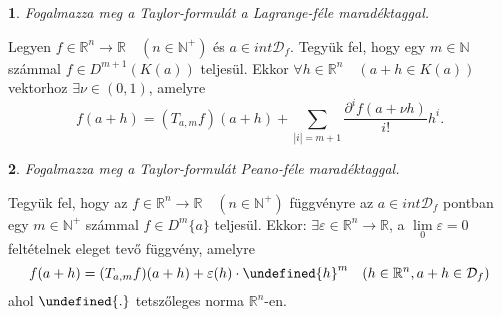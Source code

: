 \documentclass[a4paper]{article}
\def\R{\mathbb{R}}
\def\N{\mathbb{N}}
\theoremstyle{qstyle}
\newtheorem{question}{}{}
\let\norm\undefined %
\DeclarePairedDelimiter\norm{\lVert}{\rVert}
\begin{document}
	\newpage
	
	\begin{question}
		Fogalmazza meg a Taylor-formulát a Lagrange-féle maradéktaggal.
	\end{question}
	Legyen $f \in \R^n \to \R \quad (n \in \N^+)$ és $a \in int\mathcal{D}_f$. Tegyük fel, hogy egy $m \in \N$ számmal $f \in D^{m+1}(K(a))$ teljesül. Ekkor $\forall h \in \R^n \quad (a+h \in K(a))$ vektorhoz $\exists \nu \in (0,1)$, amelyre
	$$f(a+h)=(T_{a,m}f)(a+h)+\sum_{|i|=m+1}\frac{\partial^i f(a + \nu h)}{i!}h^i \text{.}$$
	
	\begin{question}
		Fogalmazza meg a Taylor-formulát Peano-féle maradéktaggal.
	\end{question}
	Tegyük fel, hogy az $f \in \R^n \to \R \quad (n \in \N^+)$ függvényre az $a \in int\mathcal{D}_f$ pontban egy $m \in \N^+$ számmal $f \in D^m\{a\}$ teljesül. Ekkor: $\exists \varepsilon \in \R^n \to \R$, a $\lim\limits_{0} \varepsilon = 0$ feltételnek eleget tevő függvény, amelyre
	$$f(a+h)=(T_{a,m}f)(a+h)+\varepsilon (h) \cdot \norm{h}^m \quad (h \in \R^n, a+h \in \mathcal{D}_f)$$
	ahol $\norm{.}$ tetszőleges norma $\R^n$-en.
	
\end{document}
